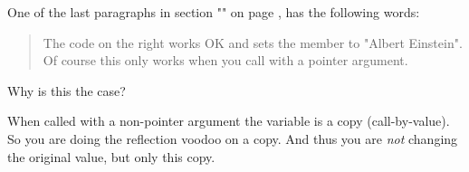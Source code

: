 \begin{Exercise}[title={Pointers and reflection},difficulty=5]
\label{ex:pointers and reflection}
\Question
One of the last paragraphs in section "" 
on page \pageref{subsec:introspection and reflection}, has
the following words:
\begin{quote}
The code on the right works OK and sets the member 
to "Albert Einstein". Of course this only works when you call 
with a pointer argument.
\end{quote}
Why is this the case?
\end{Exercise}

\begin{Answer}
\Question
When called with a non-pointer argument the variable is a copy (call-by-value). So you
are doing the reflection voodoo on a copy. And thus you are \emph{not}
changing the original value, but only this copy.
\end{Answer}
